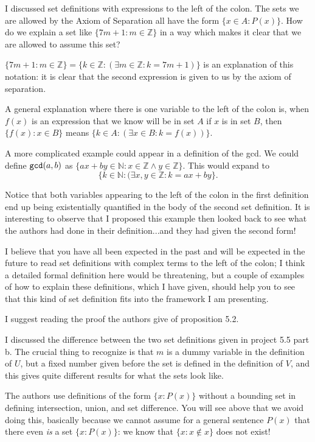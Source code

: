 \documentclass[12pt]{article}
\begin{document}
I discussed set definitions with expressions to the left of the colon.  The sets we are allowed by the Axiom of Separation all have the form $\{x \in A:P(x)\}$.  How do we explain a set like $\{7m+1:m \in {\mathbb Z}\}$ in a way which makes it clear that we are allowed to assume this set?

$\{7m+1:m \in {\mathbb Z}\} = \{k \in {\mathbb Z}: (\exists m\in {\mathbb Z}: k = 7m+1)\}$ is an explanation of this notation:
it is clear that the second expression is given to us by the axiom of separation.

A general explanation where there is one variable to the left of the colon is, when $f(x)$ is an expression that we know will be in set $A$ if $x$ is in set $B$, then $\{f(x):x \in B\}$ means $\{k \in A:(\exists x\in B:k = f(x))\}$.

A more complicated example could appear in a definition of the gcd.  We could define ${\tt gcd}(a,b)$ as
$\{ax+by \in {\mathbb N}:x \in {\mathbb Z} \wedge y \in {\mathbb Z}\}$.  This would expand to $$\{k \in {\mathbb N}:(\exists x,y \in {\mathbb Z}: k = ax+by\}.$$

Notice that both variables appearing to the left of the colon in the first definition end up being existentially quantified in the body of the second set definition.  It is interesting to observe that I proposed this example then looked back to see what the authors had done in their definition...and they had given the second form!

I believe that you have all been expected in the past and will be expected in the future to read set definitions with complex terms to the left of the colon;  I think a detailed formal definition here would be threatening, but a couple of examples of how to explain these definitions, which I have given, should help you to see that this kind of set definition fits into the framework I am presenting.

I suggest reading the proof the authors give of proposition 5.2.

I discussed the difference between the two set definitions given in project 5.5 part b.  The crucial thing to recognize
is that $m$ is a dummy variable in the definition of $U$, but a fixed number given before the set is defined in the definition of $V$, and this gives quite different results for what the sets look like. 

The authors use definitions of the form $\{x:P(x)\}$ without a bounding set in defining intersection, union, and set difference.  You will see above that we avoid doing this, basically because we cannot assume for a general sentence $P(x)$ that there
even {\em is\/} a set $\{x:P(x)\}$:  we know that $\{x :x \not\in x\}$ does not exist!
\end{document}
